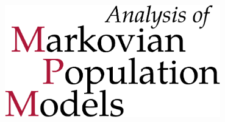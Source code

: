\thispagestyle{empty}
\begin{changemargin}{0mm}{-2cm}
\begin{center}
	\includegraphics[width=0.7\textwidth]{gfx/titlepage.pdf}\\
	\bigskip
	\textsc{\myName}

\end{center}
\end{changemargin}
